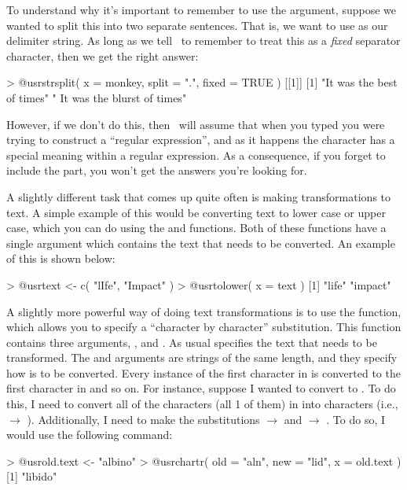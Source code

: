 To understand why it's important to remember to use the  argument, suppose we wanted to split this into two separate sentences. That is, we want to use  as our delimiter string. As long as we tell \R\ to remember to treat this as a {\it fixed} separator character, then we get the right answer:
\begin{rblock1}
> @usr{strsplit( x = monkey, split = ".", fixed = TRUE )}
[[1]]
[1] "It was the best of times"    " It was the blurst of times"
\end{rblock1}
However, if we don't do this, then \R\ will assume that when you typed  you were trying to construct a ``regular expression'', and as it happens the character  has a special meaning within a regular expression. As a consequence, if you forget to include the  part, you won't get the answers you're looking for.




A slightly different task that comes up quite often is making transformations to text. A simple example of this would be converting text to lower case or upper case, which you can do using the  and  functions. Both of these functions have a single argument  which contains the text that needs to be converted. An example of this is shown below:
\begin{rblock1}
> @usr{text <- c( "lIfe", "Impact" )}
> @usr{tolower( x = text )}
[1] "life"   "impact"
\end{rblock1}
A slightly more powerful way of doing text transformations is to use the  function, which allows you to specify a ``character by character'' substitution. This function contains three arguments, ,  and . As usual  specifies the text that needs to be transformed. The  and  arguments are strings of the same length, and they specify how  is to be converted. Every instance of the first character in  is converted to the first character in  and so on. For instance, suppose I wanted to convert  to . To do this, I need to convert all of the  characters (all 1 of them) in  into  characters (i.e.,  $\rightarrow$ ). Additionally, I need to make the substitutions  $\rightarrow$  and  $\rightarrow$ . To do so, I would use the following command:
\begin{rblock1}
> @usr{old.text <- "albino"}
> @usr{chartr( old = "aln", new = "lid", x = old.text )}
[1] "libido"
\end{rblock1} 

